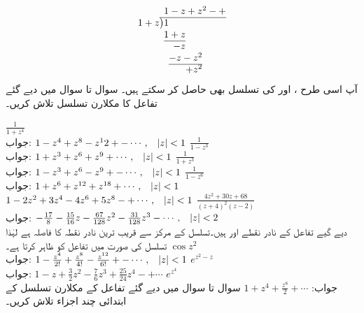 \begin{align*}
\arraycolsep=0em
\begin{array}{rrrrrrr}
  & &\multicolumn{5}{l}{1-z+z^2-+}\\
\cline{2-7}
1+z&\big)&1&&&&\\
  & &\multicolumn{2}{r}{1+ z}&&&\\
\cline{3-4}
  & & &\multicolumn{1}{r}{-z}&&&\\
  & &&\multicolumn{2}{r}{ -z-z^2}&&\\
\cline{4-5}
  & &&&+z^2&&
\end{array}
\end{align*}
آپ اسی طرح ،  اور   کی تسلسل بھی حاصل کر سکتے ہیں۔
سوال  تا سوال  میں دیے گئے تفاعل کا مکلارن تسلسل تلاش کریں۔

\quad
$\tfrac{1}{1+z^4}$\\
جواب:\quad
$1-z^4+z^8-z^12+-\cdots,\quad \abs{z}<1$
\quad
$\tfrac{1}{1-z^3}$\\
جواب:\quad
$1+z^3+z^6+z^9+\cdots,\quad \abs{z}<1$
\quad
$\tfrac{1}{1+z^3}$\\
جواب:\quad
$1-z^3+z^6-z^9+-\cdots,\quad \abs{z}<1$
\quad
$\tfrac{1}{1-z^6}$\\
جواب:\quad
$1+z^6+z^{12}+z^{18}+\cdots,\quad \abs{z}<1$\\
$1-2z^2+3z^4-4z^6+5z^8-+\cdots,\quad \abs{z}<1$
\quad
$\tfrac{4z^2+30z+68}{(z+4)^2(z-2)}$\\
جواب:\quad
$-\tfrac{17}{8}-\tfrac{15}{16}z-\tfrac{67}{128}z^2-\tfrac{31}{128}z^3-\cdots,\quad \abs{z}<2$\\
دیے گیے تفاعل کے نادر نقطے   اور  ہیں۔تسلسل کے مرکز  سے قریب ترین نادر نقطہ کا فاصلہ  ہے لہٰذا تسلسل  کی صورت میں تفاعل کو ظاہر کرتا ہے۔ 
\quad 
$\cos z^2$\\
جواب:\quad
$1-\tfrac{z^4}{2!}+\tfrac{z^8}{4!}-\tfrac{z^{12}}{6!}+-\cdots, \quad \abs{z}<1$
\quad 
$e^{z^2-z}$\\
جواب:\quad
$1-z+\tfrac{3}{2}z^2-\tfrac{7}{6}z^3+\tfrac{25}{24}z^4-+\cdots $
\quad 
$e^{z^4}$\\
جواب:\quad
$1+z^4+\frac{z^8}{2}+\cdots $
سوال  تا سوال  میں دیے گئے تفاعل کے مکلارن تسلسل کے ابتدائی چند اجزاء تلاش کریں۔

